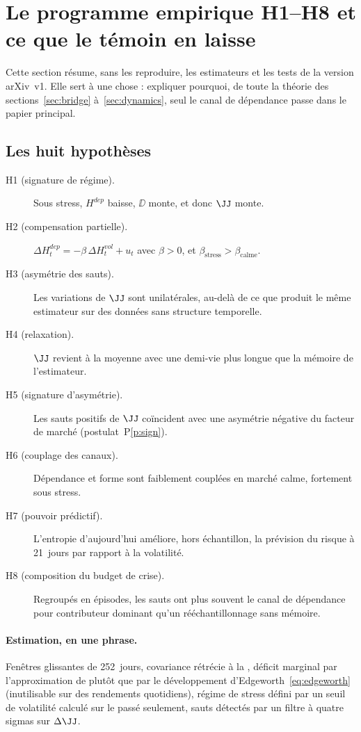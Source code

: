 
\section{Le programme empirique H1--H8 et ce que le témoin en laisse}
\label{sec:program}

Cette section résume, sans les reproduire, les estimateurs et les tests de la
version arXiv~v1. Elle sert à une chose : expliquer pourquoi, de toute la
théorie des sections~\ref{sec:bridge} à~\ref{sec:dynamics}, seul le canal de
dépendance passe dans le papier principal.

\subsection{Les huit hypothèses}

\begin{description}
\item[H1 (signature de régime).] Sous stress, $H^{dep}$ baisse, $\DD$ monte, et
donc $\JJ$ monte.
\item[H2 (compensation partielle).] $\Delta H^{dep}_t=-\beta\,\Delta H^{vol}_t+u_t$
avec $\beta>0$, et $\beta_{\text{stress}}>\beta_{\text{calme}}$.
\item[H3 (asymétrie des sauts).] Les variations de $\JJ$ sont unilatérales,
au-delà de ce que produit le même estimateur sur des données sans structure
temporelle.
\item[H4 (relaxation).] $\JJ$ revient à la moyenne avec une demi-vie plus longue
que la mémoire de l'estimateur.
\item[H5 (signature d'asymétrie).] Les sauts positifs de $\JJ$ coïncident avec
une asymétrie négative du facteur de marché (postulat~P\ref{p:sign}).
\item[H6 (couplage des canaux).] Dépendance et forme sont faiblement couplées en
marché calme, fortement sous stress.
\item[H7 (pouvoir prédictif).] L'entropie d'aujourd'hui améliore, hors
échantillon, la prévision du risque à 21~jours par rapport à la volatilité.
\item[H8 (composition du budget de crise).] Regroupés en épisodes, les sauts ont
plus souvent le canal de dépendance pour contributeur dominant qu'un
rééchantillonnage sans mémoire.
\end{description}

\paragraph{Estimation, en une phrase.} Fenêtres glissantes de 252~jours,
covariance rétrécie à la \citet{ledoit2004}, déficit marginal par
l'approximation de \citet{hyvarinen1998} plutôt que par le développement
d'Edgeworth~\eqref{eq:edgeworth} (inutilisable sur des rendements quotidiens),
régime de stress défini par un seuil de volatilité calculé sur le passé
seulement, sauts détectés par un filtre à quatre sigmas sur $\Delta\JJ$.

